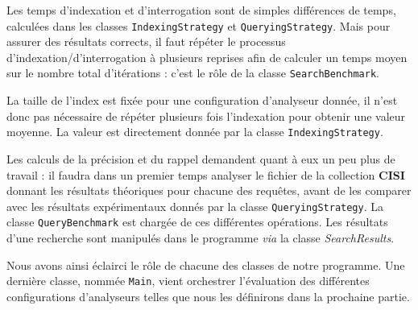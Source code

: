 Les temps d’indexation et d’interrogation sont de simples différences de temps, calculées dans les classes \texttt{IndexingStrategy} et \texttt{QueryingStrategy}. Mais pour assurer des résultats corrects, il faut répéter le processus d’indexation/d’interrogation à plusieurs reprises afin de calculer un temps moyen sur le nombre total d’itérations : c’est le rôle de la classe \texttt{SearchBenchmark}.

La taille de l’index est fixée pour une configuration d’analyseur donnée, il n’est donc pas nécessaire de répéter plusieurs fois l’indexation pour obtenir une valeur moyenne. La valeur est directement donnée par la classe \texttt{IndexingStrategy}.

Les calculs de la précision et du rappel demandent quant à eux un peu plus de travail : il faudra dans un premier temps analyser le fichier de la collection \textbf{CISI} donnant les résultats théoriques pour chacune des requêtes, avant de les comparer avec les résultats expérimentaux donnés par la classe \texttt{QueryingStrategy}. La classe \texttt{QueryBenchmark} est chargée de ces différentes opérations. Les résultats d’une recherche sont manipulés dans le programme \textit{via} la classe \textit{SearchResults}.

Nous avons ainsi éclairci le rôle de chacune des classes de notre programme. Une dernière classe, nommée \texttt{Main}, vient orchestrer l’évaluation des différentes configurations d’analyseurs telles que nous les définirons dans la prochaine partie.